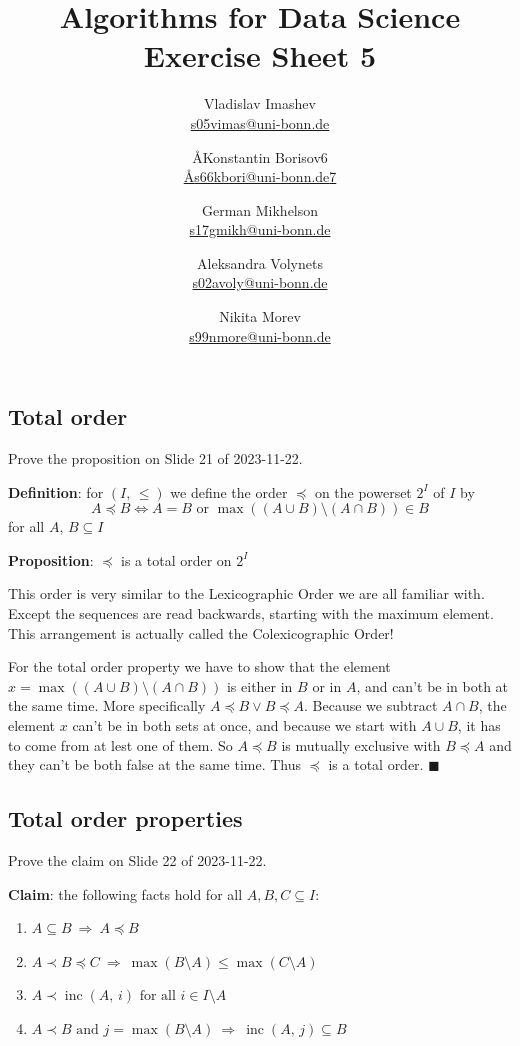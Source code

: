 \documentclass{article}
\title{Algorithms for Data Science \\ Exercise Sheet 5}
\author{
  Vladislav Imashev \\ \href{mailto:s05vimas@uni-bonn.de}{s05vimas@uni-bonn.de} \and
  \AA{Konstantin Borisov}{6} \\ \href{mailto:\AA{s66kbori@uni-bonn.de}{7}}{\AA{s66kbori@uni-bonn.de}{7}} \and
  German Mikhelson \\ \href{mailto:s17gmikh@uni-bonn.de}{s17gmikh@uni-bonn.de} \and
  Aleksandra Volynets \\ \href{mailto:s02avoly@uni-bonn.de}{s02avoly@uni-bonn.de} \and
  Nikita Morev \\ \href{mailto:s99nmore@uni-bonn.de}{s99nmore@uni-bonn.de}
}
\newcommand{\inc}{\operatorname{inc}}
\begin{document}
  \maketitle

  \setcounter{section}{5}
  \subsection{Total order}
  \begin{centerframebox}
    Prove the proposition on Slide 21 of 2023-11-22.

    \textbf{Definition}: for $(I,\, \leq)$ we define the order $\preceq$ on the powerset $2^I$ of $I$ by
    \[ A \preceq B \iff A=B \textrm{ or } \max((A\cup B)\setminus(A\cap B))\in B \]
    for all $A,\, B \subseteq I$

    \textbf{Proposition}: $\preceq$ is a total order on $2^I$
  \end{centerframebox}
  This order is very similar to the Lexicographic Order we are all familiar with.
  Except the sequences are read backwards, starting with the maximum element.
  This arrangement is actually called the Colexicographic Order!

  For the total order property we have to show that the element $x = \max((A\cup B)\setminus(A\cap B))$
  is either in $B$ or in $A$, and can't be in both at the same time.
  More specifically $A \preceq B \lor B \preceq A$.
  Because we subtract $A\cap B$, the element $x$ can't be in both sets at once,
  and because we start with $A\cup B$, it has to come from at lest one of them.
  So $A \preceq B$ is mutually exclusive with $B \preceq A$ and they can't be both false at the same time.
  Thus $\preceq$ is a total order.
  $\blacksquare$

  \subsection{Total order properties}
  \begin{centerframebox}
    Prove the claim on Slide 22 of 2023-11-22.

    \textbf{Claim}: the following facts hold for all $A,B,C \subseteq I$:
    \begin{enumerate}[label=(\roman*)]
      \item $A \subseteq B ~\Longrightarrow~ A \preceq B$
      \item $A \prec B \preceq C ~\Longrightarrow~ \max(B \setminus A) \leq \max(C \setminus A)$
      \item $A \prec \inc(A,\, i) \textrm{ for all } i \in I \setminus A$
      \item $A \prec B \textrm{ and } j = \max(B \setminus A) ~\Longrightarrow~ \inc(A,\, j) \subseteq B$
    \end{enumerate}
  \end{centerframebox}
\end{document}
